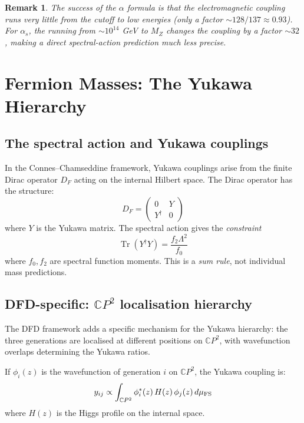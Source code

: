 \documentclass[11pt,a4paper]{article}
\newtheorem{remark}{Remark}
\newcommand{\Tr}{\operatorname{Tr}}
\newcommand{\CP}{\mathbb{C}P}
\begin{document}
\begin{remark}
The success of the $\alpha$ formula is that the electromagnetic coupling runs very little from the cutoff to low energies (only a factor $\sim 128/137 \approx 0.93$). For $\alpha_s$, the running from $\sim 10^{14}$ GeV to $M_Z$ changes the coupling by a factor $\sim 32$, making a direct spectral-action prediction much less precise.
\end{remark}

\section{Fermion Masses: The Yukawa Hierarchy}

\subsection{The spectral action and Yukawa couplings}

In the Connes--Chamseddine framework, Yukawa couplings arise from the finite Dirac operator $D_F$ acting on the internal Hilbert space. The Dirac operator has the structure:
\begin{equation}
D_F = \begin{pmatrix} 0 & Y \\ Y^\dagger & 0 \end{pmatrix}
\end{equation}
where $Y$ is the Yukawa matrix. The spectral action gives the \emph{constraint}
\begin{equation}
\Tr(Y^\dagger Y) = \frac{f_2\Lambda^2}{f_0}
\end{equation}
where $f_0, f_2$ are spectral function moments. This is a \emph{sum rule}, not individual mass predictions.

\subsection{DFD-specific: $\CP^2$ localisation hierarchy}

The DFD framework adds a specific mechanism for the Yukawa hierarchy: the three generations are localised at different positions on $\CP^2$, with wavefunction overlaps determining the Yukawa ratios.

If $\phi_i(z)$ is the wavefunction of generation $i$ on $\CP^2$, the Yukawa coupling is:
\begin{equation}
y_{ij} \propto \int_{\CP^2} \phi_i^*(z)\,H(z)\,\phi_j(z)\,d\mu_{\rm FS}
\end{equation}
where $H(z)$ is the Higgs profile on the internal space.
\end{document}
